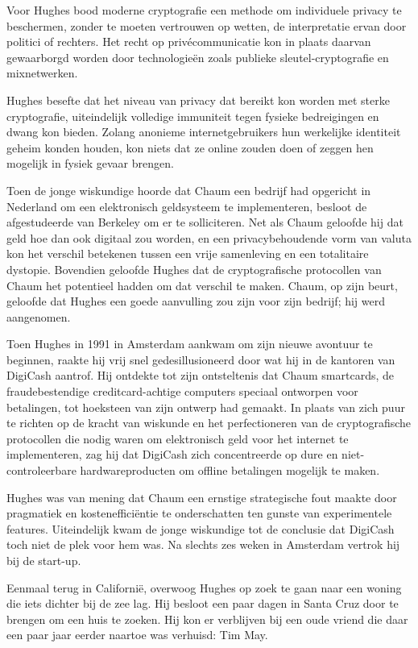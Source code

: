 \documentclass[smalldemyvopaper,11pt,twoside,onecolumn,openright,extrafontsizes,hidelinks]{memoir}
\begin{document}
Voor Hughes bood moderne cryptografie een methode om individuele privacy
te beschermen, zonder te moeten vertrouwen op wetten, de interpretatie
ervan door politici of rechters. Het recht op privécommunicatie kon in
plaats daarvan gewaarborgd worden door technologieën zoals publieke
sleutel-cryptografie en mixnetwerken.

Hughes besefte dat het niveau van privacy dat bereikt kon worden met
sterke cryptografie, uiteindelijk volledige immuniteit tegen fysieke
bedreigingen en dwang kon bieden. Zolang anonieme internetgebruikers hun
werkelijke identiteit geheim konden houden, kon niets dat ze online
zouden doen of zeggen hen mogelijk in fysiek gevaar brengen.

Toen de jonge wiskundige hoorde dat Chaum een bedrijf had opgericht in
Nederland om een elektronisch geldsysteem te implementeren, besloot de
afgestudeerde van Berkeley om er te solliciteren. Net als Chaum geloofde
hij dat geld hoe dan ook digitaal zou worden, en een privacybehoudende
vorm van valuta kon het verschil betekenen tussen een vrije samenleving
en een totalitaire dystopie. Bovendien geloofde Hughes dat de
cryptografische protocollen van Chaum het potentieel hadden om dat
verschil te maken. Chaum, op zijn beurt, geloofde dat Hughes een goede
aanvulling zou zijn voor zijn bedrijf; hij werd aangenomen.

Toen Hughes in 1991 in Amsterdam aankwam om zijn nieuwe avontuur te
beginnen, raakte hij vrij snel gedesillusioneerd door wat hij in de
kantoren van DigiCash aantrof. Hij ontdekte tot zijn ontsteltenis dat
Chaum smartcards, de fraudebestendige creditcard-achtige computers
speciaal ontworpen voor betalingen, tot hoeksteen van zijn ontwerp had
gemaakt. In plaats van zich puur te richten op de kracht van wiskunde en
het perfectioneren van de cryptografische protocollen die nodig waren om
elektronisch geld voor het internet te implementeren, zag hij dat
DigiCash zich concentreerde op dure en niet-controleerbare
hardwareproducten om offline betalingen mogelijk te maken.

Hughes was van mening dat Chaum een ernstige strategische fout maakte
door pragmatiek en kostenefficiëntie te onderschatten ten gunste van
experimentele features. Uiteindelijk kwam de jonge wiskundige tot de
conclusie dat DigiCash toch niet de plek voor hem was. Na slechts zes
weken in Amsterdam vertrok hij bij de start-up.

Eenmaal terug in Californië, overwoog Hughes op zoek te gaan naar een
woning die iets dichter bij de zee lag. Hij besloot een paar dagen in
Santa Cruz door te brengen om een huis te zoeken. Hij kon er verblijven
bij een oude vriend die daar een paar jaar eerder naartoe was verhuisd:
Tim May.
\end{document}
